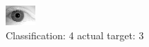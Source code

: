 \begin{figure}[h!]
\begin{center}
\includegraphics[width=0.60\columnwidth]{figures/ID2067_class_4_target_3.png}
\end{center}
\caption{ Classification: 4 actual target: 3}
\label{fig:ID2067_class_4_target_3}
\end{figure}
